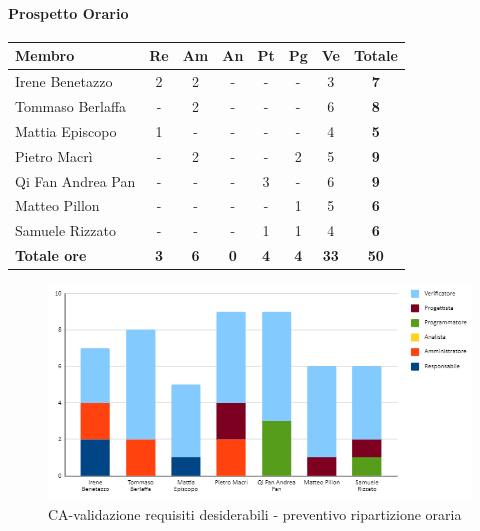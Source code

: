 \paragraph{Prospetto Orario}
\begin{center}
	\renewcommand{\arraystretch}{1.8} %
	\begin{tabular}{ |m{10em}|c|c|c|c|c|c|c| }
	\hline
	\textbf{Membro} & \textbf{Re} & \textbf{Am} &  \textbf{An} &  \textbf{Pt} &  \textbf{Pg} &  \textbf{Ve} &  \textbf{Totale}\\
    \hline
    Irene Benetazzo   & 2 & 2 & - & - & - & 3 & \textbf{7} \\
    \hline
    Tommaso Berlaffa  & - & 2 & - & - & - & 6 & \textbf{8} \\
    \hline
    Mattia Episcopo   & 1 & - & - & - & - & 4 & \textbf{5} \\
    \hline
    Pietro Macrì      & - & 2 & - & - & 2 & 5 & \textbf{9} \\
    \hline
    Qi Fan Andrea Pan & - & - & - & 3 & - & 6 & \textbf{9} \\
    \hline
    Matteo Pillon     & - & - & - & - & 1 & 5 & \textbf{6} \\
    \hline
    Samuele Rizzato   & - & - & - & 1 & 1 & 4 & \textbf{6} \\
    \hline
    \textbf{Totale ore} & \textbf{3} & \textbf{6} &  \textbf{0} &  \textbf{4} &  \textbf{4} &  \textbf{33} &  \textbf{50}\\
    \hline
	\end{tabular}
\end{center}
\begin{figure}[H]
    \centering\includegraphics[width=\textwidth, height=\textheight, keepaspectratio]{images/preventivo/CA-desiderabili-orario.png}
    \caption{CA-validazione requisiti desiderabili - preventivo ripartizione oraria}
\end{figure}
\pagebreak
